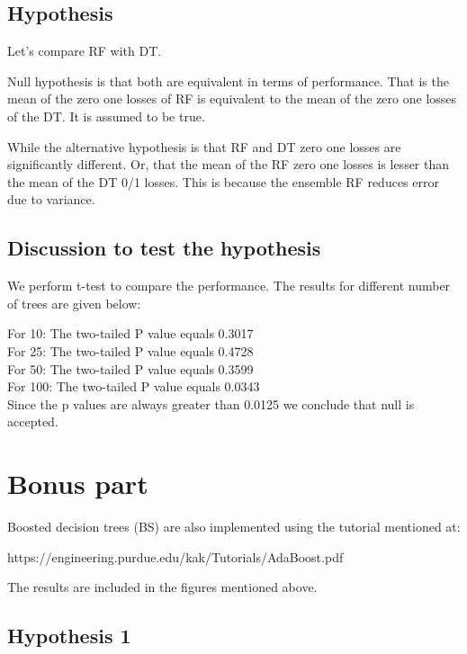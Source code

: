 \documentclass[12pt]{article}
\begin{document}
\subsection{Hypothesis}

Let's compare RF with DT. 

Null hypothesis is that both are equivalent in terms of performance. That is the mean of the
zero one losses of RF is equivalent to the mean of the zero one losses of the DT. It is assumed
to be true. 

While the alternative hypothesis is that RF and DT zero one losses are significantly different.
Or, that the mean of the RF zero one losses is lesser than the mean of the DT 0/1 losses.
This is because the ensemble RF reduces error due to variance.

\subsection{Discussion to test the hypothesis}

We perform t-test to compare the performance. The results for different number of trees are given below:

For 10:
  The two-tailed P value equals 0.3017   \\

For 25:
  The two-tailed P value equals 0.4728   \\

For 50:
  The two-tailed P value equals 0.3599    \\

For 100:
  The two-tailed P value equals 0.0343   \\

Since the p values are always greater than 0.0125 we conclude that null is accepted.

\newpage 

\section{Bonus part}

Boosted decision trees (BS) are also implemented using the tutorial mentioned at:

https://engineering.purdue.edu/kak/Tutorials/AdaBoost.pdf

The results are included in the figures mentioned above.

\subsection{Hypothesis 1}
\end{document}
